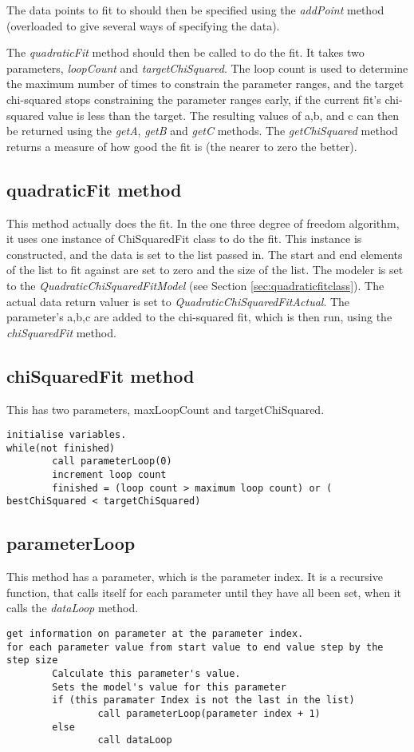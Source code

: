 \documentclass[10pt,a4paper]{article}
\begin{document}
The data points to fit to should then be specified using the {\em addPoint} method (overloaded to give
several ways of specifying the data).

The {\em quadraticFit} method should then be called to do the fit.
It takes two parameters, {\em loopCount} and {\em targetChiSquared}. The loop count is used to
determine the maximum number of times to constrain the parameter ranges, and the target chi-squared
stops constraining the parameter ranges early, if the current fit's chi-squared value is less than the
target. The resulting values of a,b, and c can then
be returned using the {\em getA}, {\em getB} and {\em getC} methods. The {\em getChiSquared} method returns a measure
of how good the fit is (the nearer to zero the better).

\subsection{quadraticFit method}
This method actually does the fit. In the one three degree of freedom algorithm, it uses one
instance of ChiSquaredFit class to do the fit. This instance is constructed, and the data is set to
the list passed in. The start and end elements of the list to fit against are set to zero and the 
size of the list. The modeler is set to the {\em QuadraticChiSquaredFitModel} 
(see Section \ref{sec:quadraticfitclass}). The actual data return valuer is set to 
{\em QuadraticChiSquaredFitActual}. The parameter's a,b,c are added to the chi-squared fit, which is then run,
using the {\em chiSquaredFit} method.

\subsection{chiSquaredFit method}
This has two parameters, maxLoopCount and targetChiSquared.
\begin{verbatim}
initialise variables.
while(not finished)
        call parameterLoop(0)
        increment loop count
        finished = (loop count > maximum loop count) or ( bestChiSquared < targetChiSquared)
\end{verbatim}

\subsection{parameterLoop}
This method has a parameter, which is the parameter index. It is a recursive function, that
calls itself for each parameter until they have all been set, when it calls the {\em dataLoop} method.
\begin{verbatim}
get information on parameter at the parameter index.
for each parameter value from start value to end value step by the step size
        Calculate this parameter's value.
        Sets the model's value for this parameter
        if (this paramater Index is not the last in the list)
                call parameterLoop(parameter index + 1)
        else
                call dataLoop
\end{verbatim}
\end{document}

